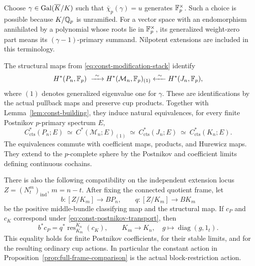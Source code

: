 Choose $\gamma\in\operatorname{Gal}(\overline K/K)$ such that
$\bar\chi_p(\gamma)=u$ generates $\mathbb F_p^{\times}$.  Such a choice is
possible because $K/\mathbb Q_p$ is unramified.  For a vector space with an
endomorphism annihilated by a polynomial whose roots lie in
$\mathbb F_p^{\times}$, its generalized weight-zero part means its
$(\gamma-1)$-primary summand.  Nilpotent extensions are included in this
terminology.

\begin{proposition}
\label{prop:modification-transport}
The structural maps from \eqref{eq:const-modification-stack} identify
\begin{equation}
 H^*(P_n,\Fp)\ \xrightarrow{\ \sim\ }
 H^*(\mathcal M_n,\Fp)_{(1)}
 \xleftarrow{\ \sim\ }H^*(J_n,\Fp),
 \label{eq:const-weight-zero}
\end{equation}
where $(1)$ denotes generalized eigenvalue one for $\gamma$.
These are identifications by the actual pullback maps and preserve cup
products.  Together with Lemma~\ref{lem:const-building}, they induce
natural equivalences, for every finite Postnikov $p$-primary spectrum $E$,
\begin{equation}
 C^*_{\mathrm{cts}}(P_n;E)\ \simeq\
 C^*(\mathcal M_n;E)_{(1)}\ \simeq\
 C^*_{\mathrm{cts}}(J_n;E)\ \simeq\
 C^*_{\mathrm{cts}}(K_n;E).
 \label{eq:const-postnikov-transport}
\end{equation}
The equivalences commute with coefficient maps, products, and Hurewicz
maps.  They extend to the $p$-complete sphere by the Postnikov and
coefficient limits defining continuous cochains.

There is also the following compatibility on the independent extension
locus $Z=(N_t^m)_{\mathrm{ind}}$, $m=n-t$.  After fixing the connected
quotient frame, let
\[
 b:[Z/K_m]\longrightarrow BP_n,\qquad
 q:[Z/K_m]\longrightarrow BK_m
\]
be the positive middle-bundle classifying map and the structural map.
If $c_P$ and $c_K$ correspond under
\eqref{eq:const-postnikov-transport}, then
\begin{equation}
 b^*c_P=q^*\operatorname{res}_{K_m}^{K_n}(c_K),
 \qquad K_m\longrightarrow K_n,\quad
             g\longmapsto\operatorname{diag}(g,1_t).
 \label{eq:const-block-action}
\end{equation}
This equality holds for finite Postnikov coefficients, for their stable
limits, and for the resulting ordinary cup actions.  In particular the
constant action in Proposition~\ref{prop:full-frame-comparison} is the
actual block-restriction action.
\end{proposition}

